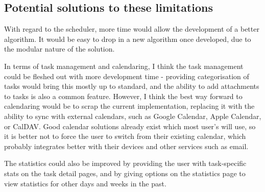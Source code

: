 \documentclass{article}
\begin{document}
\subsection{Potential solutions to these limitations}
With regard to the scheduler,
more time would allow the development of a better algorithm.
It would be easy to drop in a new algorithm once developed,
due to the modular nature of the solution.

In terms of task management and calendaring,
I think the task management could be fleshed out with more development time -
providing categorisation of tasks would bring this mostly up to standard,
and the ability to add attachments to tasks is also a common feature.
However,
I think the best way forward to calendaring would be to scrap the current implementation,
replacing it with the ability to sync with external calendars,
such as Google Calendar,
Apple Calendar,
or CalDAV.
Good calendar solutions already exist which most user's will use,
so it is better not to force the user to switch from their existing calendar,
which probably integrates better with their devices and other services such as email.

The statistics could also be improved by providing the user with task-specific stats on the task detail pages,
and by giving options on the statistics page to view statistics for other days and weeks in the past.

\label{page:the_end}
\end{document}
